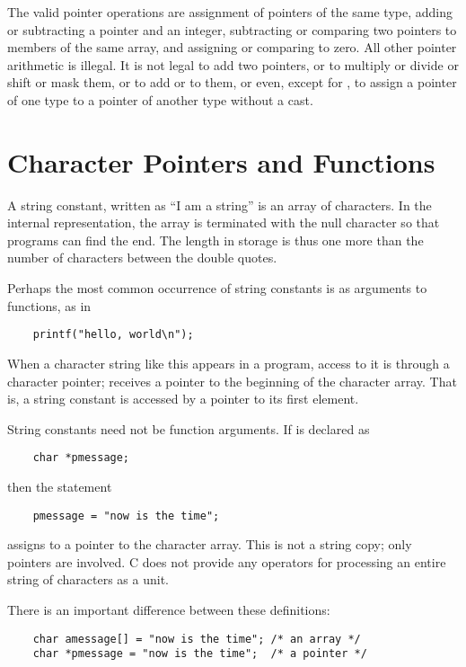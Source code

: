 The valid pointer operations are assignment of pointers of the same type, adding or subtracting a pointer and an integer, subtracting or comparing two pointers to members of the same array, and assigning or comparing to zero.
All other pointer arithmetic is illegal.
It is not legal to add two pointers, or to multiply or divide or shift or mask them, or to add  or  to them, or even, except for , to assign a pointer of one type to a pointer of another type without a cast.



\section{Character Pointers and Functions}


A string constant, written as ``I am a string'' is an array of characters.
In the internal representation, the array is terminated with the null character  so that programs can find the end.
The length in storage is thus one more than the number of characters between the double quotes.

Perhaps the most common occurrence of string constants is as arguments to functions, as in
\begin{lstlisting}
    printf("hello, world\n");
\end{lstlisting}
When a character string like this appears in a program, access to it is through a character pointer;  receives a pointer to the beginning of the character array.
That is, a string constant is accessed by a pointer to its first element.

String constants need not be function arguments. If  is declared as
\begin{lstlisting}
    char *pmessage;
\end{lstlisting}
then the statement
\begin{lstlisting}
    pmessage = "now is the time";
\end{lstlisting}
assigns to  a pointer to the character array. This is not a string copy; only pointers are involved.
C does not provide any operators for processing an entire string of characters as a unit.


There is an important difference between these definitions:
\begin{lstlisting}
    char amessage[] = "now is the time"; /* an array */
    char *pmessage = "now is the time";  /* a pointer */
\end{lstlisting}

